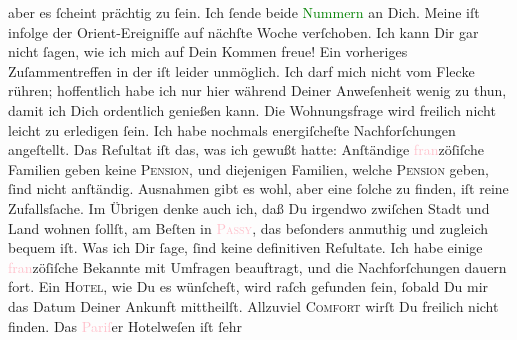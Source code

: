                aber es ſcheint prächtig zu ſein.  Ich ſende beide
                  \textcolor{green}{Nummern}{} an Dich.\pend
           \pstart
           Meine \label{K_L02805-5v}\label{K_L02805-5h} iſt infolge der Orient-Ereigniſſe auf nächſte Woche verſchoben. {\pb}Ich kann Dir gar nicht ſagen, wie ich mich auf Dein
               Kommen freue! Ein vorheriges Zuſammentreffen in der \label{K_L02805-9v}\label{K_L02805-9h} iſt leider unmöglich. Ich darf mich nicht vom Flecke
               rühren; hoffentlich habe ich nur hier während Deiner Anweſenheit wenig zu thun, damit
               ich Dich ordentlich genießen kann. Die Wohnungsfrage wird freilich nicht leicht zu
               erledigen ſein.  Ich habe nochmals energiſcheſte
               Nachforſchungen angeſtellt. Das Reſultat iſt das, was ich gewußt hatte: Anſtändige
                  \textcolor{pink}{fran}{}zöſiſche Familien geben
               keine \textsc{Pension}, und diejenigen Familien, welche \textsc{Pension} geben, ſind nicht anſtändig. Ausnahmen gibt {\pb}es wohl, aber eine ſolche zu finden, iſt reine
               Zufallsſache. Im Übrigen denke auch ich, daß Du irgendwo zwiſchen Stadt und Land
               wohnen ſollſt, am Beſten in \textsc{\textcolor{pink}{Passy}{}\ledrightnote{\textcolor{pink}{16. Arrondissement (Passy)}}}, das beſonders anmuthig und zugleich bequem iſt. Was ich Dir ſage, ſind keine
               definitiven Reſultate. Ich habe einige \textcolor{pink}{fran}{}zöſiſche Bekannte mit Umfragen beauftragt, und die
               Nachforſchungen dauern fort. Ein \textsc{Hotel}, wie Du es
               wünſcheſt, wird raſch gefunden ſein, ſobald Du mir das Datum  Deiner Ankunft mittheilſt. Allzuviel \textsc{Comfort} wirſt Du freilich nicht finden. Das \textcolor{pink}{Pariſ}{}\ledrightnote{\textcolor{pink}{Paris}}er {\pb}Hotelweſen iſt ſehr
